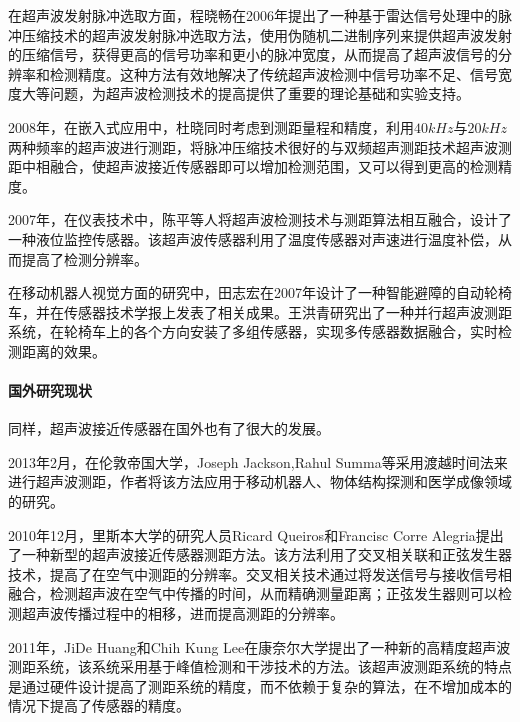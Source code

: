 	在超声波发射脉冲选取方面，程晓畅在2006年提出了一种基于雷达信号处理中的脉冲压缩技术的超声波发射脉冲选取方法，使用伪随机二进制序列来提供超声波发射的压缩信号，获得更高的信号功率和更小的脉冲宽度，从而提高了超声波信号的分辨率和检测精度。这种方法有效地解决了传统超声波检测中信号功率不足、信号宽度大等问题，为超声波检测技术的提高提供了重要的理论基础和实验支持。
	
	2008年，在嵌入式应用中，杜晓同时考虑到测距量程和精度，利用$40kHz$与$20kHz$两种频率的超声波进行测距，将脉冲压缩技术很好的与双频超声测距技术超声波测距中相融合，使超声波接近传感器即可以增加检测范围，又可以得到更高的检测精度。
		
	2007年，在仪表技术中，陈平等人将超声波检测技术与测距算法相互融合，设计了一种液位监控传感器。该超声波传感器利用了温度传感器对声速进行温度补偿，从而提高了检测分辨率。
	
	在移动机器人视觉方面的研究中，田志宏在2007年设计了一种智能避障的自动轮椅车，并在传感器技术学报上发表了相关成果。王洪青研究出了一种并行超声波测距系统，在轮椅车上的各个方向安装了多组传感器，实现多传感器数据融合，实时检测距离的效果。
	
    \paragraph{国外研究现状}
	同样，超声波接近传感器在国外也有了很大的发展。
	
	2013年2月，在伦敦帝国大学，Joseph Jackson,Rahul Summa等采用渡越时间法来进行超声波测距，作者将该方法应用于移动机器人、物体结构探测和医学成像领域的研究。
	
	2010年12月，里斯本大学的研究人员Ricard Queiros和Francisc Corre Alegria提出了一种新型的超声波接近传感器测距方法。该方法利用了交叉相关联和正弦发生器技术，提高了在空气中测距的分辨率。交叉相关技术通过将发送信号与接收信号相融合，检测超声波在空气中传播的时间，从而精确测量距离；正弦发生器则可以检测超声波传播过程中的相移，进而提高测距的分辨率。
	
	2011年，JiDe Huang和Chih Kung Lee在康奈尔大学提出了一种新的高精度超声波测距系统，该系统采用基于峰值检测和干涉技术的方法。该超声波测距系统的特点是通过硬件设计提高了测距系统的精度，而不依赖于复杂的算法，在不增加成本的情况下提高了传感器的精度。
	
    
